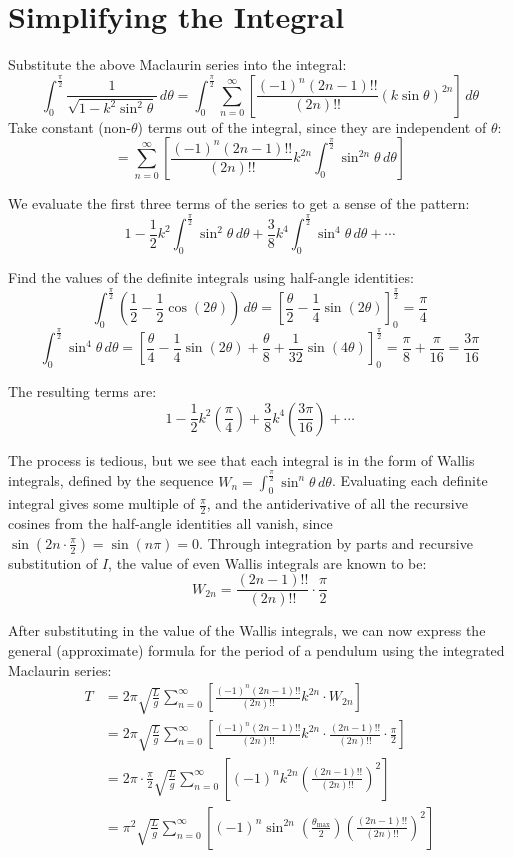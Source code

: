 \documentclass[12pt]{article}
\begin{document}
\section{Simplifying the Integral}

Substitute the above Maclaurin series into the integral:
\[
  \int_{0}^{\frac{\pi}{2}} \frac{1}{\sqrt{1 - k^2
  \sin^2 \theta}} \, d\theta = \int_{0}^{\frac{\pi}{2}}
  \sum_{n=0}^{\infty} \left[\frac{(-1)^n (2n-1)!!}{(2n)!!}
  {\left(k\sin\theta\right)}^{2n}\right] \, d\theta
\]
Take constant (non-$\theta$) terms out of the integral, since they
are independent of $\theta$:
\[
  = \sum_{n=0}^{\infty} \left[\frac{(-1)^n (2n-1)!!}{(2n)!!} k^{2n}
  \int_{0}^{\frac{\pi}{2}} \sin^{2n} \theta \, d\theta\right]
\]

We evaluate the first three terms of the series to get a sense of the pattern:
\[
  1 - \frac{1}{2}k^2\int_{0}^{\frac{\pi}{2}} \sin^2 \theta \, d\theta
  + \frac{3}{8}k^4\int_{0}^{\frac{\pi}{2}} \sin^4 \theta \, d\theta + \cdots
\]

Find the values of the definite integrals using half-angle identities:
\[
  \int_{0}^{\frac{\pi}{2}} \left(\frac{1}{2} -
  \frac{1}{2}\cos(2\theta)\right) \, d\theta = \left[\frac{\theta}{2}
  - \frac{1}{4}\sin(2\theta)\right]_{0}^{\frac{\pi}{2}} = \frac{\pi}{4}
\]
\[
  \int_{0}^{\frac{\pi}{2}} \sin^4 \theta \, d\theta =
  \left[\frac{\theta}{4} - \frac{1}{4}\sin(2\theta) +
    \frac{\theta}{8} +
  \frac{1}{32}\sin(4\theta)\right]_{0}^{\frac{\pi}{2}} =
  \frac{\pi}{8} + \frac{\pi}{16} = \frac{3\pi}{16}
\]

The resulting terms are:
\[
  1 - \frac{1}{2}k^2\left(\frac{\pi}{4}\right) +
  \frac{3}{8}k^4\left(\frac{3\pi}{16}\right) + \cdots
\]

The process is tedious, but we see that each integral is in the form
of Wallis integrals, defined by the sequence $W_n =
\int_{0}^{\frac{\pi}{2}} \sin^n \theta \, d\theta$. Evaluating each
definite integral gives some multiple of $\frac{\pi}{2}$, and the
antiderivative of all the recursive cosines from the half-angle
identities all vanish, since $\sin(2n \cdot \frac{\pi}{2}) =
\sin(n\pi) = 0$. Through integration by parts and recursive
substitution of $I$, the value of even Wallis integrals are known to be:
\[
  W_{2n} = \frac{(2n-1)!!}{(2n)!!} \cdot \frac{\pi}{2}
\]

After substituting in the value of the Wallis integrals, we can now express the general (approximate) formula for the period of a pendulum using the integrated Maclaurin series:
\begin{align*}
  T &= 2\pi \sqrt{\frac{L}{g}} \sum_{n=0}^{\infty} \left[\frac{(-1)^n (2n-1)!!}{(2n)!!} k^{2n} \cdot W_{2n}\right] \\
  &= 2\pi \sqrt{\frac{L}{g}} \sum_{n=0}^{\infty} \left[\frac{(-1)^n (2n-1)!!}{(2n)!!} k^{2n} \cdot \frac{(2n-1)!!}{(2n)!!} \cdot \frac{\pi}{2}\right] \\
  &= 2\pi \cdot \frac{\pi}{2} \sqrt{\frac{L}{g}} \sum_{n=0}^{\infty} \left[(-1)^n k^{2n} \left(\frac{(2n-1)!!}{(2n)!!}\right)^2 \right] \\
  &= \pi^2 \sqrt{\frac{L}{g}} \sum_{n=0}^{\infty} \left[(-1)^n \sin^{2n}(\frac{\theta_{\mathrm{max}}}{2}) \left(\frac{(2n-1)!!}{(2n)!!}\right)^2 \right]
\end{align*}
\end{document}
